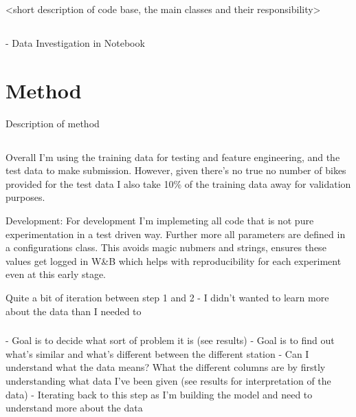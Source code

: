 \documentclass{article}
\begin{document}
    <short description of code base, the main classes and their responsibility>

    \subsection*{}

    \subsubsection*{}
    - Data Investigation in Notebook


    \section{Method}\label{sec:method}

    Description of method\\

    \subsection*{}

    Overall I'm using the training data for testing and feature engineering, and the test data to make submission.
    However, given there's no true no number of bikes provided for the test data I also take 10\% of the training data away
    for validation purposes.

    Development:
    For development I'm implemeting all code that is not pure experimentation in a test driven way. Further more all parameters are defined in a configurations class. This avoids magic nubmers and
    strings, ensures these values get logged in W&B which helps with reproducibility for each experiment even at this early stage.

    Quite a bit of iteration between step 1 and 2 - I didn't wanted to learn more about the data than I needed to

    \subsubsection*{}
    - Goal is to decide what sort of problem it is (see results)
    - Goal is to find out what's similar and what's different between the different station
    - Can I understand what the data means? What the different columns are by firstly understanding what data I've been given
    (see results for interpretation of the data)
    - Iterating back to this step as I'm building the model and need to understand more about the data
\end{document}
